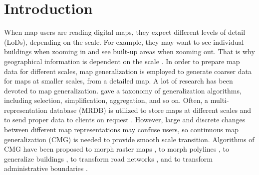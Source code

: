 \documentclass[ijgi,article,submit,moreauthors,pdftex]{Definitions/mdpi}
\begin{document}



\section{Introduction}


When map users are reading digital maps,
they expect different levels of detail (LoDs), depending on the scale.
For example, they may want to see individual buildings when zooming in
and see built-up areas when zooming out.
That is why geographical information is dependent on the scale
\citep{Muller1995Generalization,Weibel1997}. 
In order to prepare map data for different scales,
map generalization is employed to generate coarser data 
for maps at smaller scales,
from a detailed map.
A lot of research has been devoted to map generalization.
\citet{Mackaness2017Generalization} gave a taxonomy of 
generalization algorithms, 
including selection, simplification, aggregation, and so on.
Often, a multi-representation database (MRDB) is utilized to store
maps at different scales and to send proper data to clients on request
\citep[\eg][]{Hampe2004multiple}.
However, large and discrete changes between different map representations
may confuse users,
so continuous map generalization (CMG) is needed to
provide smooth scale transition.
Algorithms of CMG have been proposed 
to morph raster maps
\citep[\eg][]{Pantazis2009a,Pantazis2009b}, 
to morph polylines
\citep[\eg][]{Noellenburg2008,Peng2013LSA,Deng2015,Li2017Annealing},
to generalize buildings
\citep[\eg][]{Li2017_Building,Peng2017Building,Touya2017Progressive},
to transform road networks
\citep[\eg][]{Suba2016Road,Chimani2014Eat},
and to transform administrative boundaries
\citep[\eg][]{Peng2016Admin}.
\end{document}
